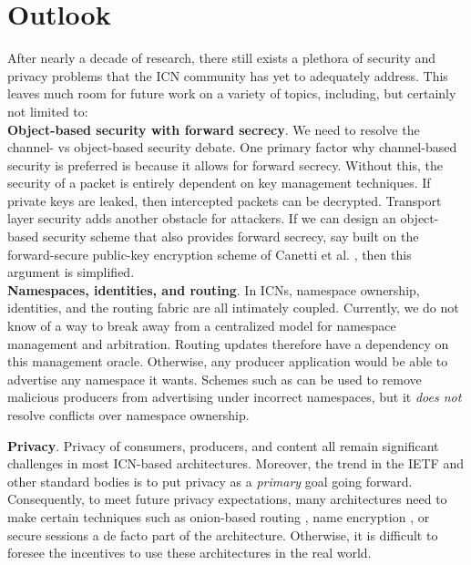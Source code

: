 \section{Outlook}
\label{sec:outlook}
After nearly a decade of research, there still exists a plethora of security
and privacy problems that the ICN community has yet to adequately address. 
This leaves much room for future work on a variety of topics, including, but
certainly not limited to:\\

\noindent
{\bf Object-based security with forward secrecy}. We need to resolve the 
    channel- vs object-based security debate. One primary factor why channel-based
    security is preferred is because it allows for forward secrecy. Without this,
    the security of a packet is entirely dependent on key management techniques.
    If private keys are leaked, then intercepted packets can be decrypted.
    Transport layer security adds another obstacle for attackers. If we can design an object-based security scheme that
    also provides forward secrecy, say built on the forward-secure public-key
    encryption scheme of Canetti et al. \cite{canetti2003forward}, then this argument is simplified.\\

\noindent
{\bf Namespaces, identities, and routing}. In ICNs, namespace ownership, identities, and
    the routing fabric are all intimately coupled. Currently, we do not know of a way
    to break away from a centralized model for namespace management and arbitration. 
    Routing updates therefore have a dependency on this management oracle. Otherwise,
    any producer application would be able to advertise any namespace it wants. Schemes
    such as \cite{dibenedetto2015mitigating} can be used to remove malicious producers
    from advertising under incorrect namespaces, but it \emph{does not} resolve conflicts
    over namespace ownership.

\noindent
{\bf Privacy}. Privacy of consumers, producers, and content all remain significant
    challenges in most ICN-based architectures. Moreover, the trend in the IETF and other
    standard bodies is to put privacy as a \emph{primary} goal going forward. Consequently,
    to meet future privacy expectations, many architectures need to make certain techniques
    such as onion-based routing \cite{uzun2011anonymous}, name encryption \cite{privacy}, or secure
    sessions \cite{wood-icnrg-ccnxkeyexchange-00} a de facto part of the architecture. 
    Otherwise, it is difficult to foresee the incentives to use these architectures in the
    real world.
